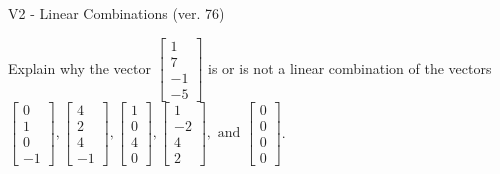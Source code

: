 \begin{exercise}
  \begin{exerciseTitle}V2 - Linear Combinations (ver. 76)\end{exerciseTitle}
  \begin{exerciseStatement}
    Explain why the vector \(\left[\begin{array}{c}
1 \\
7 \\
-1 \\
-5
\end{array}\right]\)  is or is not a linear 
	combination of the vectors \(\left[\begin{array}{c}
0 \\
1 \\
0 \\
-1
\end{array}\right] , \left[\begin{array}{c}
4 \\
2 \\
4 \\
-1
\end{array}\right] , \left[\begin{array}{c}
1 \\
0 \\
4 \\
0
\end{array}\right] , \left[\begin{array}{c}
1 \\
-2 \\
4 \\
2
\end{array}\right] , \text{ and } \left[\begin{array}{c}
0 \\
0 \\
0 \\
0
\end{array}\right]\).
	



\end{exerciseStatement}
\end{exercise}
